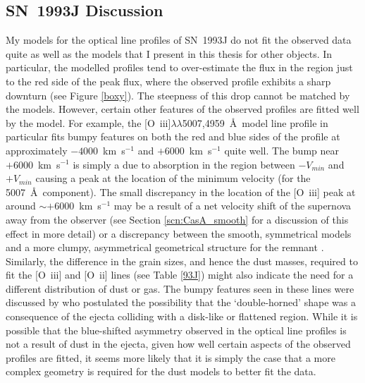 \subsection{SN~1993J  Discussion}
\label{scn:discuss93j}
My models for the optical line profiles of SN~1993J do not fit the observed data quite as well as the models that I present in this thesis for other objects.  In particular, the modelled profiles tend to over-estimate the flux in the region just to the red side of the peak flux, where the observed profile exhibits a sharp downturn (see Figure \ref{boxy}).  The steepness of this drop cannot be matched by the models.  However, certain other features of the observed profiles are fitted well by the model.  For example, the [O~{\sc iii}]$\lambda\lambda$5007,4959~\AA\  model line profile in particular fits bumpy features on both the red and blue sides of the profile at approximately $-4000$~km~s$^{-1}$ and $+6000$~km~s$^{-1}$ quite well.  The bump near $+6000$~km~s$^{-1}$ is simply a due to absorption in the region between $-V_{min}$ and $+V_{min}$ causing a peak at the location of the minimum velocity (for the 5007~\AA\ component).  The small discrepancy in the location of the [O~{\sc iii}] peak at around $\sim+6000$~km~s$^{-1}$ may be a result of a net velocity shift of the supernova away from the observer (see Section \ref{scn:CasA_smooth} for a discussion of this effect in more detail) or a discrepancy between the smooth, symmetrical models and a more clumpy, asymmetrical geometrical structure for the remnant \citep{Tran1997}.  Similarly, the difference in the grain sizes, and hence the dust masses, required to fit the [O~{\sc iii}] and [O~{\sc ii}] lines (see Table \ref{93J}) might also indicate the need for a different distribution of dust or gas.  The bumpy features seen in these lines were discussed by \citet{Matheson2000b} who postulated the possibility that the `double-horned' shape was a consequence of the ejecta colliding with a disk-like or flattened region. While it is possible that the blue-shifted asymmetry observed in the optical line profiles is not a result of dust in the ejecta, given how well certain aspects of the observed profiles are fitted, it seems more likely that it is simply the case that a more complex geometry is required for the dust models to better fit the data.

